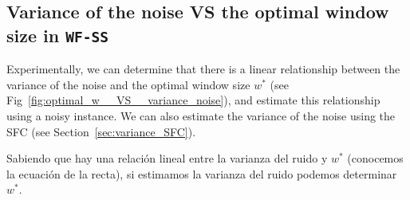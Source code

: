 \begin{comment}
If the \gls{GT} were known, Eq.~\ref{eq:WF_SFC} becomes
\begin{equation}
  \mathbf{W}(\mathbf{x}) = \text{SFC}(\mathbf{x}).
  \label{eq:WF_SFC*}
\end{equation}
We will refer to this filter as ``Wiener-SFC''.
\end{comment}


\begin{subappendices}

\section{Variance of the noise VS the optimal window size in \texttt{WF-SS}}
\label{sec:WF_window_size__VS__variance_noise}

Experimentally, we can determine that there is a linear relationship between the variance of the noise and the optimal window size $w^*$ (see Fig~\ref{fig:optimal_w__VS__variance_noise}), and estimate this relationship using a noisy instance. We can also estimate the variance of the noise using the \gls{SFC} (see Section~\ref{sec:variance_SFC}). 

Sabiendo que hay una relación lineal entre la varianza del ruido y $w^*$ (conocemos la ecuación de la recta), si estimamos la varianza del ruido podemos determinar $w^*$.

\end{subappendices}
